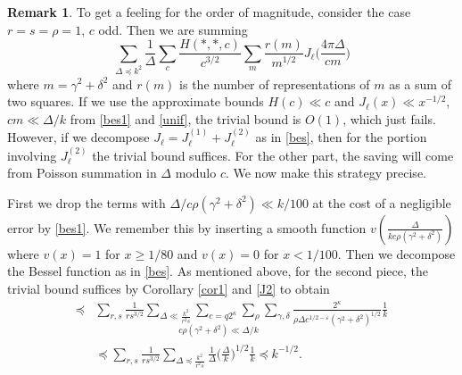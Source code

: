 \documentclass[11pt]{amsart}
\numberwithin{equation}{section}
\theoremstyle{plain}
\theoremstyle{definition}
\newtheorem{remark}{Remark}
\renewcommand{\geq}{\geqslant}
\numberwithin{equation}{section}
\begin{document}


\begin{remark}
To get a feeling for the order of magnitude, consider the case $r = s =\rho = 1$, $c$ odd. Then we are summing
$$\sum_{\Delta \preccurlyeq	 k^2} \frac{1}{\Delta} \sum_c \frac{H(*, *, c)}{c^{3/2}} \sum_{m} \frac{r(m)}{m^{1/2}}   J_{\ell}\Big(\frac{4\pi \Delta}{cm}\Big)$$
where $m = \gamma^2 + \delta^2$ and $r(m)$ is the number of representations of $m$ as a sum of two squares. If we use the approximate bounds $H(c) \ll c$ and  $J_{\ell}(x) \ll x^{-1/2}$, 
 $cm \ll \Delta/k$ from \eqref{bes1} and \eqref{unif},  the trivial bound is  $O(1)$, which just fails. However, if we decompose $J_{\ell} = J_{\ell}^{(1)} + J_{\ell}^{(2)}$ as in \eqref{bes}, then for the portion involving $J_{\ell}^{(2)}$  the trivial bound suffices. For the other part, the saving will come from Poisson summation in $\Delta$ modulo $c$. We now make this strategy precise. 
\end{remark}
First we drop the terms with $\Delta/c\rho(\gamma^2 + \delta^2) \ll k/100$ at the cost of a negligible error by \eqref{bes1}. We remember this by inserting a smooth function $v(\frac{\Delta}{kc\rho(\gamma^2 + \delta^2)})$ where $v(x) = 1$ for $x \geq 1/80$ and $v(x) = 0$ for $x < 1/100$. Then we decompose the Bessel function as in \eqref{bes}. As mentioned above, for the second piece, the trivial bound suffices by Corollary \ref{cor1} and \eqref{J2} to obtain
\begin{equation}\label{1a}
\begin{split}
  \preccurlyeq  & \sum_{r, s} \frac{1}{rs^{3/2}} \underset{c\rho(\gamma^2 + \delta^2) \ll \Delta/k}{\sum_{\Delta \ll \frac{k^2}{r^2s}}\sum_{c= q2^{\kappa}}  \sum_{\rho}  \sum_{\gamma, \delta} } \frac{2^{\kappa}}{\rho \Delta c^{1/2-\varepsilon}  (\gamma^2 + \delta^2)^{1/2 }  } \frac{1}{k}\\
& \preccurlyeq   \sum_{r, s} \frac{1}{rs^{3/2}} \sum_{\Delta \preccurlyeq \frac{k^2}{r^2s}} \frac{1}{\Delta} \Big(\frac{\Delta}{k}\Big)^{1/2} \frac{1}{k} \preccurlyeq k^{-1/2}.
\end{split}
\end{equation}
\end{document}
